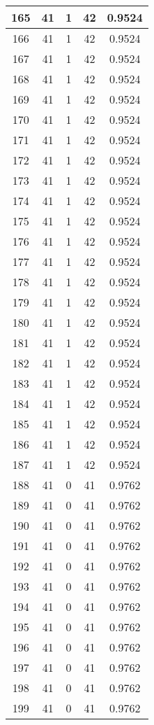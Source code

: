 \documentclass[letterpaper, 12pt]{article}
\begin{document}
\begin{longtable}{|c|c|c|c|c|}
\hline
165 & 41 & 1 & 42 & 0.9524 \\
\hline
166 & 41 & 1 & 42 & 0.9524 \\
\hline
167 & 41 & 1 & 42 & 0.9524 \\
\hline
168 & 41 & 1 & 42 & 0.9524 \\
\hline
169 & 41 & 1 & 42 & 0.9524 \\
\hline
170 & 41 & 1 & 42 & 0.9524 \\
\hline
171 & 41 & 1 & 42 & 0.9524 \\
\hline
172 & 41 & 1 & 42 & 0.9524 \\
\hline
173 & 41 & 1 & 42 & 0.9524 \\
\hline
174 & 41 & 1 & 42 & 0.9524 \\
\hline
175 & 41 & 1 & 42 & 0.9524 \\
\hline
176 & 41 & 1 & 42 & 0.9524 \\
\hline
177 & 41 & 1 & 42 & 0.9524 \\
\hline
178 & 41 & 1 & 42 & 0.9524 \\
\hline
179 & 41 & 1 & 42 & 0.9524 \\
\hline
180 & 41 & 1 & 42 & 0.9524 \\
\hline
181 & 41 & 1 & 42 & 0.9524 \\
\hline
182 & 41 & 1 & 42 & 0.9524 \\
\hline
183 & 41 & 1 & 42 & 0.9524 \\
\hline
184 & 41 & 1 & 42 & 0.9524 \\
\hline
185 & 41 & 1 & 42 & 0.9524 \\
\hline
186 & 41 & 1 & 42 & 0.9524 \\
\hline
187 & 41 & 1 & 42 & 0.9524 \\
\hline
188 & 41 & 0 & 41 & 0.9762 \\
\hline
189 & 41 & 0 & 41 & 0.9762 \\
\hline
190 & 41 & 0 & 41 & 0.9762 \\
\hline
191 & 41 & 0 & 41 & 0.9762 \\
\hline
192 & 41 & 0 & 41 & 0.9762 \\
\hline
193 & 41 & 0 & 41 & 0.9762 \\
\hline
194 & 41 & 0 & 41 & 0.9762 \\
\hline
195 & 41 & 0 & 41 & 0.9762 \\
\hline
196 & 41 & 0 & 41 & 0.9762 \\
\hline
197 & 41 & 0 & 41 & 0.9762 \\
\hline
198 & 41 & 0 & 41 & 0.9762 \\
\hline
199 & 41 & 0 & 41 & 0.9762 \\
\hline
\end{longtable}
\end{document}
